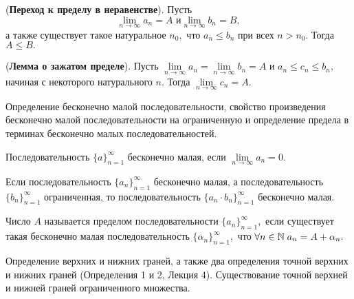 \begin{lemma}
	(\textbf{Переход к пределу в неравенстве}).
	Пусть $$\lim\limits_{n\rightarrow\infty}a_n=A
		\textrm{ и} \lim\limits_{n\rightarrow\infty}b_n=B,$$
	а также существует такое натуральное $n_0,$
	что $a_n\leq b_n$ при всех $n>n_0.$
	Тогда $A\leq B.$
\end{lemma}

\begin{theorem} (\textbf{Лемма о зажатом пределе}).
	Пусть
	$\lim\limits_{n\rightarrow\infty}a_n=
		\lim\limits_{n\rightarrow\infty}b_n=A$
	и $a_n\leq c_n\leq b_n,$ начиная
	с некоторого натурального $n.$
	Тогда $\lim\limits_{n\rightarrow\infty}c_n=A.$
\end{theorem}

\newpage
\begin{problem}
Определение бесконечно малой последовательности, свойство произведения бесконечно
малой последовательности на ограниченную и определение предела в терминах бесконечно малых последовательностей.
\end{problem}

\begin{definition}
	Последовательность $\{a\}_{n=1}^{\infty}$
	бесконечно малая, если
	$\lim\limits_{n\rightarrow\infty}a_n=0.$
\end{definition}
\begin{lemma}
	Если
	последовательность $\{a_n\}_{n=1}^{\infty}$
	бесконечно малая, а последовательность
	$\{b_n\}_{n=1}^{\infty}$ ограниченная, то
	последовательность $\{a_n\cdot
		b_n\}_{n=1}^{\infty}$ бесконечно малая.
\end{lemma}

\begin{definition}
	Число $A$ называется пределом
	последовательности $\{a_n\}_{n=1}^{\infty},$
	если существует такая бесконечно малая
	последовательность $\{\alpha_n\}_{n=1}^{\infty},$
	что $\forall n\in\mathbb{N}\;a_n=A+\alpha_n.$
\end{definition}

\newpage
\begin{problem}
Определение верхних и нижних граней, а также два определения точной верхних и
нижних граней (Определения 1 и 2, Лекция 4). Существование точной верхней и нижней
граней ограниченного множества.
\end{problem}

